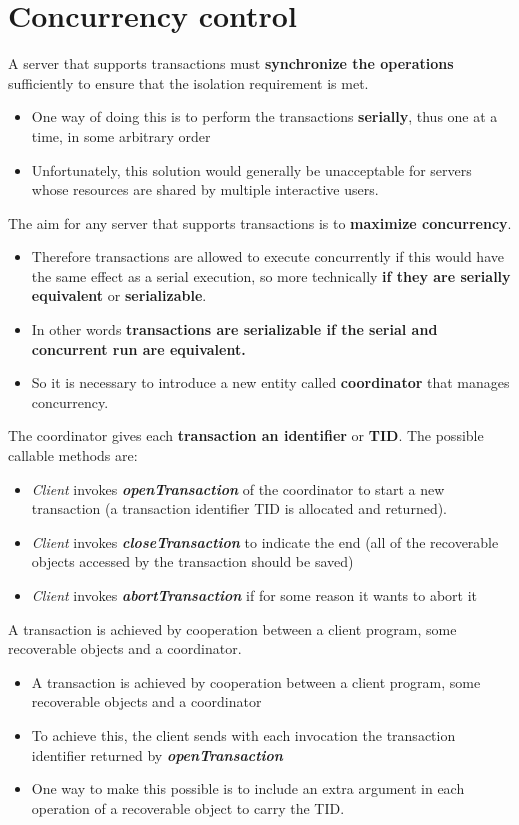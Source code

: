 \section{Concurrency control}
A server that supports transactions must \textbf{synchronize the operations} sufficiently to ensure that the isolation requirement is met.
\begin{itemize}
    \item One way of doing this is to perform the transactions \textbf{serially}, thus one at a time, in some arbitrary order
    \item Unfortunately, this solution would generally be unacceptable for servers whose resources are shared by multiple interactive users.
\end{itemize}
The aim for any server that supports transactions is to \textbf{maximize concurrency}.
\begin{itemize}
    \item Therefore transactions are allowed to execute concurrently if this would have the same effect as a serial execution, so more technically \textbf{if they are serially equivalent} or \textbf{serializable}.
    \item In other words \textbf{ transactions are serializable if the serial and concurrent run are equivalent.}
    \item So it is necessary to introduce a new entity called \textbf{coordinator} that manages concurrency.
\end{itemize}
The coordinator gives each \textbf{transaction an identifier} or \textbf{TID}. The possible callable methods are:
\begin{itemize}
    \item \textit{Client} invokes \textit{\textbf{openTransaction}} of the coordinator to start a new transaction (a transaction identifier TID is allocated and returned).
    \item \textit{Client} invokes \textit{\textbf{closeTransaction}} to indicate the end (all of the recoverable objects accessed by the transaction should be saved)
    \item \textit{Client} invokes \textit{\textbf{abortTransaction}} if for some reason it wants to abort it
\end{itemize}
A transaction is achieved by cooperation between a client program, some recoverable objects and a coordinator.
\begin{itemize}
    \item A transaction is achieved by cooperation between a client program, some recoverable objects and a coordinator
    \item To achieve this, the client sends with each invocation the transaction identifier returned by \textit{\textbf{openTransaction}}
    \item  One way to make this possible is to include an extra argument in each operation of a recoverable object to carry the TID.
\end{itemize}

